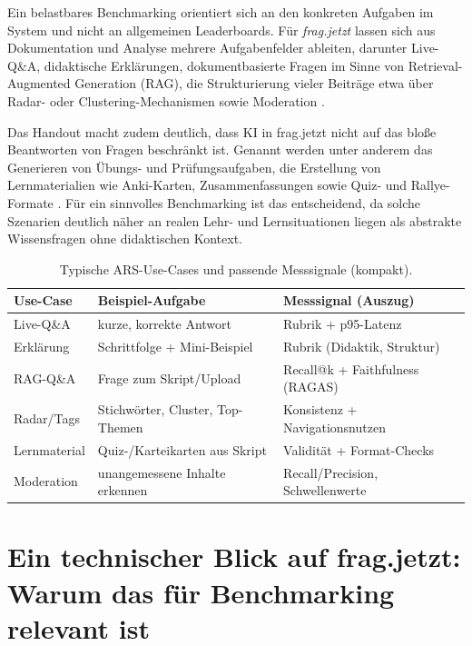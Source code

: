 Ein belastbares Benchmarking orientiert sich an den konkreten Aufgaben im System und nicht an allgemeinen Leaderboards. Für \emph{frag.jetzt} lassen sich aus Dokumentation und Analyse mehrere Aufgabenfelder ableiten, darunter Live-Q\&A, didaktische Erklärungen, dokumentbasierte Fragen im Sinne von Retrieval-Augmented Generation (RAG), die Strukturierung vieler Beiträge etwa über Radar- oder Clustering-Mechanismen sowie Moderation \parencite{fragjetzt-site,fragjetzt-handout,fragjetzt-analyse,educa-fragjetzt}.

Das Handout macht zudem deutlich, dass KI in frag.jetzt nicht auf das bloße Beantworten von Fragen beschränkt ist. Genannt werden unter anderem das Generieren von Übungs- und Prüfungsaufgaben, die Erstellung von Lernmaterialien wie Anki-Karten, Zusammenfassungen sowie Quiz- und Rallye-Formate \parencite{fragjetzt-handout}. Für ein sinnvolles Benchmarking ist das entscheidend, da solche Szenarien deutlich näher an realen Lehr- und Lernsituationen liegen als abstrakte Wissensfragen ohne didaktischen Kontext.

\begin{table}[ht]
\centering
\footnotesize
\setlength{\tabcolsep}{3pt}
\begin{tabular}{@{}p{1.5cm} p{2.1cm} p{2.25cm}@{}}
\toprule
\textbf{Use-Case} & \textbf{Beispiel-Aufgabe} & \textbf{Messsignal (Auszug)} \\
\midrule
Live-Q\&A &
kurze, korrekte Antwort &
Rubrik + p95-Latenz \\

Erklärung &
Schrittfolge + Mini-Beispiel &
Rubrik (Didaktik, Struktur) \\

RAG-Q\&A &
Frage zum Skript/Upload &
Recall@k + Faithfulness (RAGAS) \\

Radar/Tags &
Stichwörter, Cluster, Top-Themen &
Konsistenz + Navigationsnutzen \\

Lernmaterial &
Quiz-/Karteikarten aus Skript &
Validität + Format-Checks \\

Moderation &
unangemessene Inhalte erkennen &
Recall/Precision, Schwellenwerte \\
\bottomrule
\end{tabular}
\caption{Typische ARS-Use-Cases und passende Messsignale (kompakt).}
\label{tab:usecases}
\end{table}

\section{Ein technischer Blick auf frag.jetzt: Warum das für Benchmarking relevant ist}

